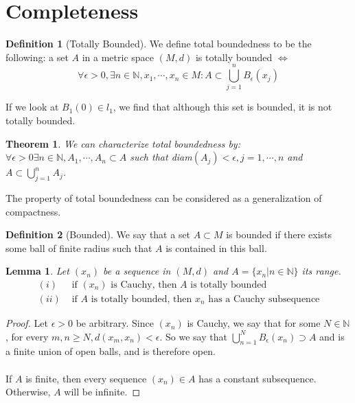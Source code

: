 \documentclass{article}
\newtheorem{theorem}{Theorem}[section]
\newtheorem{lemma}{Lemma}[section]
\theoremstyle{definition}
\newtheorem{definition}{Definition}[section]
\begin{document}
\section{Completeness}
    \begin{mdframed}
        \begin{definition}[Totally Bounded]
            We define total boundedness to be the following: a set $A$ in a metric space $(M,d)$ is totally bounded $\Leftrightarrow$
            \[
                \forall \epsilon > 0, \exists n \in \mathbb{N}, x_1, \cdots , x_n \in M : A \subset \bigcup_{j=1}^n B_\epsilon(x_j)
            \]
        \end{definition}
    \end{mdframed}
    If we look at $B_1(0) \in l_1$, we find that although this set is bounded, it is not totally bounded.
    \begin{mdframed}
        \begin{theorem}
            We can characterize total boundedness by: $\forall \epsilon > 0 \exists n \in \mathbb{N}, A_1, \cdots, A_n \subset A$ such that diam$(A_j) < \epsilon, j = 1, \cdots, n$ and $A \subset \bigcup_{j=1}^n A_j$.
        \end{theorem}
    \end{mdframed}
    The property of total boundedness can be considered as a generalization of compactness.
    \begin{definition}[Bounded]
        We say that a set $A \subset M$ is bounded if there exists some ball of finite
        radius such that $A$ is contained in this ball.
    \end{definition}
    \begin{lemma} Let $(x_n)$ be a sequence in $(M,d)$ and $A = \{x_n | n \in \mathbb{N}\}$ its range.
        \begin{align*}
            (i) & \text{ if $(x_n)$ is Cauchy, then $A$ is totally bounded}\\
            (ii) & \text{ if $A$ is totally bounded, then $x_n$ has a Cauchy subsequence}
        \end{align*}
    \end{lemma}
    \begin{proof}
         Let $\epsilon > 0$ be arbitrary. Since $(x_n)$ is Cauchy,
        we say that for some $N \in \mathbb{N}$, for every $m,n \geq N, d(x_m, x_n) < \epsilon$.
        So we say that $\bigcup_{n=1}^N B_\epsilon(x_n) \supset A$ and is a finite union of open
        balls, and is therefore open.\\\\
        If $A$ is finite, then every sequence $(x_n) \in A$ has a constant subsequence. Otherwise,
        $A$ will be infinite.
    \end{proof}
\end{document}
